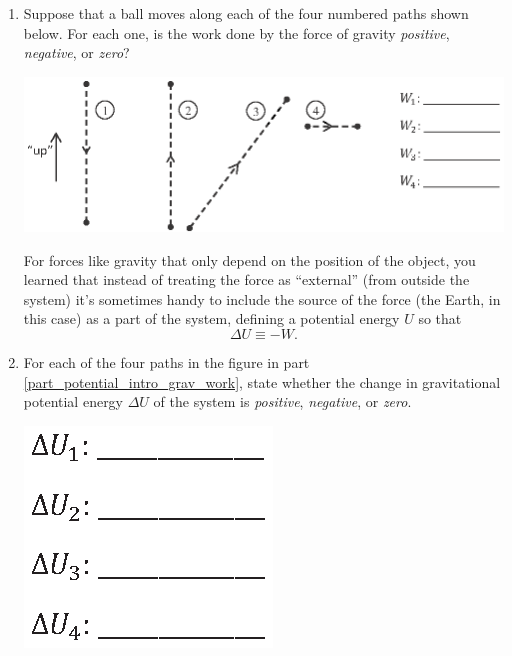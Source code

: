 \begin{enumerate}[labparts]

\item Suppose that a ball moves along each of the four numbered paths shown below.  For each one, is the work done by the force of gravity \textit{positive}, \textit{negative}, or \textit{zero}? \label{part_potential_intro_grav_work} 
\begin{center}
\vspace{0.1in}
\includegraphics{potential_intro/activity_1_figs/gravity_paths.eps}
\vspace{0.1in}
\end{center}

For forces like gravity that only depend on the position of the object, you learned that instead of treating the force as  ``external'' (from outside the system) it's sometimes handy to include the source of the force (the Earth, in this case) as a part of the system, defining a potential energy $U$ so that
$$\Delta U \equiv -W.$$

\item For each of the four paths in the figure in part \ref{part_potential_intro_grav_work}, state whether the change in gravitational potential energy $\Delta U$ of the system is \textit{positive}, \textit{negative}, or \textit{zero}.
\begin{center}
\vspace{0.05in}
\includegraphics{potential_intro/activity_1_figs/gravity_potentials.eps}
\vspace{0.05in}
\end{center}


\end{enumerate}
